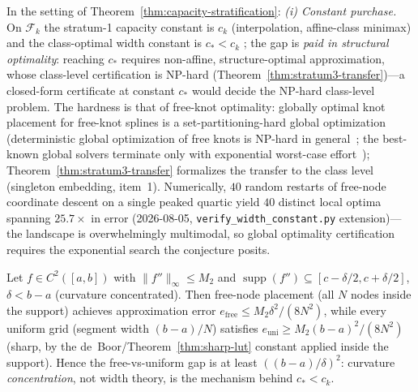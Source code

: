 \vspace{4pt}
\begin{theorem}
\label{thm:capacity-tradeoff}
In the setting of Theorem~\ref{thm:capacity-stratification}:
\emph{(i) Constant purchase.} On $\mathcal{F}_k$ the stratum-1 capacity
constant is $c_k$ (interpolation, affine-class minimax) and the
class-optimal width constant is $c_* < c_k$
\cite{pinkus1985width}; the gap is \emph{paid in structural
optimality}: reaching $c_*$ requires non-affine, structure-optimal
approximation, whose class-level certification is NP-hard
(Theorem~\ref{thm:stratum3-transfer})---a
closed-form certificate at constant $c_*$ would decide the NP-hard
class-level problem. The hardness is that of free-knot optimality:
globally optimal knot
placement for free-knot splines is a set-partitioning-hard global
optimization (deterministic global optimization of free knots is
NP-hard in general~\cite{beliakov2004least}; the best-known global
solvers terminate only with exponential worst-case
effort~\cite{mohr2023globally}); Theorem~\ref{thm:stratum3-transfer}
formalizes the transfer to the class level (singleton embedding,
item~1). Numerically, $40$ random
restarts of free-node coordinate descent on a single peaked quartic
yield $40$ distinct local optima spanning $25.7\times$ in error
(2026-08-05, \texttt{verify\_width\_constant.py} extension)---the
landscape is overwhelmingly multimodal, so global optimality
certification requires the exponential search the conjecture posits.

\vspace{2pt}
\begin{lemma}
\label{lem:gap_concentrated}
Let $f \in C^2([a,b])$ with $\|f''\|_\infty \leq M_2$ and
$\operatorname{supp}(f'') \subseteq [c - \delta/2, c + \delta/2]$,
$\delta < b-a$ (curvature concentrated). Then free-node placement
(all $N$ nodes inside the support) achieves approximation error
$e_{\text{free}} \leq M_2 \delta^2 / (8N^2)$, while every uniform grid
(segment width $(b-a)/N$) satisfies
$e_{\text{uni}} \geq M_2 (b-a)^2 / (8N^2)$ (sharp, by the
de~Boor/Theorem~\ref{thm:sharp-lut} constant applied inside the
support). Hence the free-vs-uniform gap is at least
$((b-a)/\delta)^2$: curvature \emph{concentration}, not width theory,
is the mechanism behind $c_* < c_k$.
\end{lemma}


\end{theorem}
